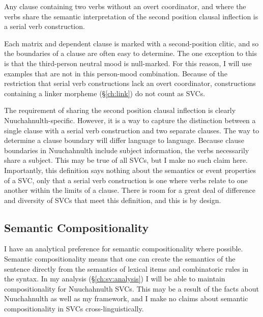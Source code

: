 \ex \label{svcdef}
Any clause containing two verbs without an overt coordinator, and where the verbs share the semantic interpretation of the second position clausal inflection is a serial verb construction.
\xe

Each matrix and dependent clause is marked with a second-position clitic, and so the boundaries of a clause are often easy to determine. The one exception to this is that the third-person neutral mood is null-marked. For this reason, I will use examples that are not in this person-mood combination. Because of the restriction that serial verb constructions lack an overt coordinator, constructions containing a linker morpheme (\S\ref{ch:link}) do not count as SVCs.

The requirement of sharing the second position clausal inflection is clearly Nuuchahnulth-specific. However, it is a way to capture the distinction between a single clause with a serial verb construction and two separate clauses. The way to determine a clause boundary will differ language to language. Because clause boundaries in Nuuchahnulth include subject information, the verbs necessarily share a subject. This may be true of all SVCs, but I make no such claim here. Importantly, this definition says nothing about the semantics or event properties of a SVC, only that a serial verb construction is one where verbs relate to one another within the limits of a clause. There is room for a great deal of difference and diversity of SVCs that meet this definition, and this is by design.


\subsection{Semantic Compositionality} \label{ch:sv:def:compositionality}

I have an analytical preference for semantic compositionality where possible. Semantic compositionality means that one can create the semantics of the sentence directly from the semantics of lexical items and combinatoric rules in the syntax. In my analysis (\S\ref{ch:sv:analysis}) I will be able to maintain compositionality for Nuuchahnulth SVCs. This may be a result of the facts about Nuuchahnulth as well as my framework, and I make no claims about semantic compositionality in SVCs cross-linguistically.

